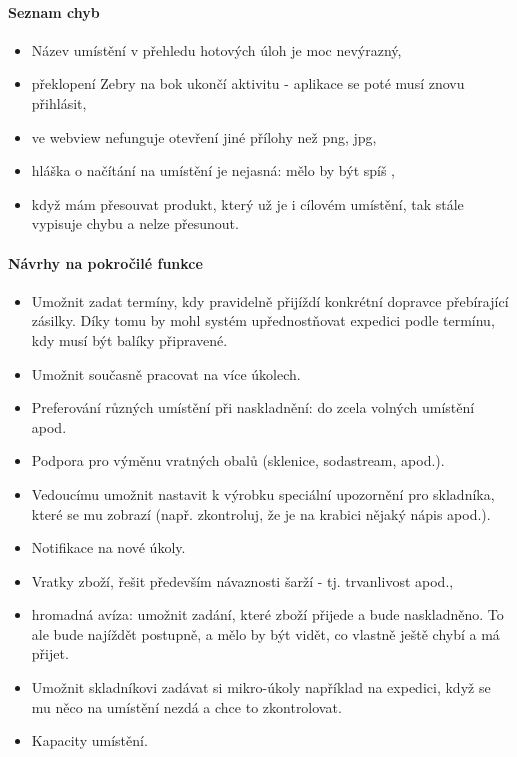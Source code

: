 \paragraph{Seznam chyb}

\begin{itemize}
	\item Název umístění v přehledu hotových úloh je moc nevýrazný,
	\item překlopení Zebry na bok ukončí aktivitu - aplikace se poté musí znovu přihlásit,
	\item ve webview nefunguje otevření jiné přílohy než png, jpg,
	\item hláška o načítání na umístění je nejasná: mělo by být spíš ,
	\item když mám přesouvat produkt, který už je i cílovém umístění, tak stále vypisuje chybu a nelze přesunout.
\end{itemize}

\paragraph{Návrhy na pokročilé funkce}

\begin{itemize}
	\item Umožnit zadat termíny, kdy pravidelně přijíždí konkrétní dopravce přebírající zásilky. Díky tomu by mohl systém upřednostňovat expedici podle termínu, kdy musí být balíky připravené.
	\item Umožnit současně pracovat na více úkolech.
	\item Preferování různých umístění při naskladnění: do zcela volných umístění apod.
	\item Podpora pro výměnu vratných obalů (sklenice, sodastream, apod.).
	\item Vedoucímu umožnit nastavit k výrobku speciální upozornění pro skladníka, které se mu zobrazí (např. zkontroluj, že je na krabici nějaký nápis apod.).
	\item Notifikace na nové úkoly.
	\item Vratky zboží, řešit především návaznosti šarží - tj. trvanlivost apod.,
	\item hromadná avíza: umožnit zadání, které zboží přijede a bude naskladněno. To ale bude najíždět postupně, a mělo by být vidět, co vlastně ještě chybí a má přijet.
	\item Umožnit skladníkovi zadávat si mikro-úkoly například na expedici, když se mu něco na umístění nezdá a chce to zkontrolovat.
	\item Kapacity umístění.
\end{itemize}
